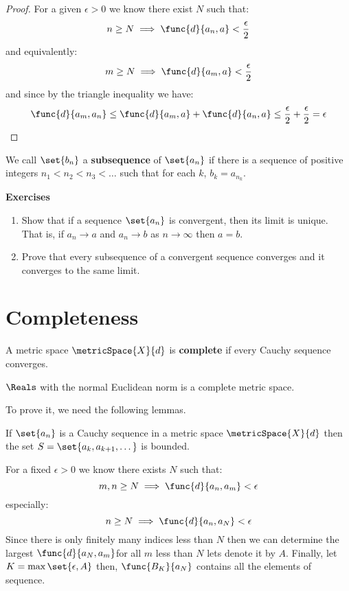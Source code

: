\begin{proof}
    For a given \(\epsilon > 0 \) we know there exist \(N\) such that:
    \[ n \geq N \implies \func{d}{a_n,a} < \frac{\epsilon}{2}\]
    and equivalently:
    \[ m \geq N \implies \func{d}{a_m,a} < \frac{\epsilon}{2}\]
    and since by the triangle inequality we have:
    \[  \func{d}{a_m,a_n} \leq  \func{d}{a_m,a} +  \func{d}{a_n,a} \leq \frac{\epsilon}{2} + \frac{\epsilon}{2} = \epsilon\]
\end{proof}

\begin{definition} [Subsequence]
    We call \(\set{ b_n }\) a \textbf{subsequence} of \(\set{ a_n }\) if there is a sequence of positive integers \(n_1 < n_2 < n_3 < \dots \) such that for each \(k\), \(b_k = a_{n_k}\).
\end{definition}

{\Large\textbf{Exercises}}
\begin{enumerate}
    \item Show that if a sequence \(\set{a_n }\) is convergent, then its limit is unique. That is, if \(a_n \to a \) and \(a_n \to b\) as \(n \to \infty\) then \(a = b\).
    \item Prove that every subsequence of a convergent sequence converges and it converges to the same limit.
\end{enumerate}
\newpage

\section{Completeness}
A metric space \(\metricSpace{X}{d}\) is \textbf{complete} if every Cauchy sequence converges.

\begin{proposition}
    \(\Reals\) with the normal Euclidean norm is a complete metric space.
\end{proposition}

To prove it, we need the following lemmas.

\begin{lemma} \label{Bounded}
    If \(\set{ a_n }\) is a Cauchy sequence in a metric space \(\metricSpace{X}{d}\) then the set \(S = \set{ a_k , a_{k + 1}, \dots }\) is bounded.
\end{lemma}

\begin{prooflemma}
    For a fixed \(\epsilon > 0\) we know there exists \(N\) such that:
    \begin{equation*}
        m,n \geq N \implies \func{d}{a_n,a_m} < \epsilon
    \end{equation*}
    especially:
    \begin{equation*}
        n \geq N \implies \func{d}{a_n,a_N} < \epsilon
    \end{equation*}
    Since there is only finitely many indices less than \(N\) then we can determine the largest \(\func{d}{a_N, a_m}\)for all \(m\) less than \(N\) lets denote it by \(A\). Finally, let \(K = \max \set{ \epsilon, A}\) then, \(\func{B_K}{a_N} \) contains all the elements of sequence.
\end{prooflemma}

